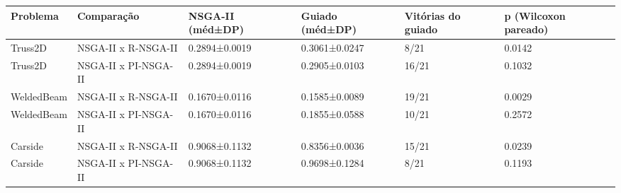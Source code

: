 \begin{tabular}{llllll}
\toprule
Problema & Comparação & NSGA-II (méd±DP) & Guiado (méd±DP) & Vitórias do guiado & p (Wilcoxon pareado) \\
\midrule
Truss2D & NSGA-II x R-NSGA-II & 0.2894±0.0019 & 0.3061±0.0247 & 8/21 & 0.0142 \\
Truss2D & NSGA-II x PI-NSGA-II & 0.2894±0.0019 & 0.2905±0.0103 & 16/21 & 0.1032 \\
WeldedBeam & NSGA-II x R-NSGA-II & 0.1670±0.0116 & 0.1585±0.0089 & 19/21 & 0.0029 \\
WeldedBeam & NSGA-II x PI-NSGA-II & 0.1670±0.0116 & 0.1855±0.0588 & 10/21 & 0.2572 \\
Carside & NSGA-II x R-NSGA-II & 0.9068±0.1132 & 0.8356±0.0036 & 15/21 & 0.0239 \\
Carside & NSGA-II x PI-NSGA-II & 0.9068±0.1132 & 0.9698±0.1284 & 8/21 & 0.1193 \\
\bottomrule
\end{tabular}
